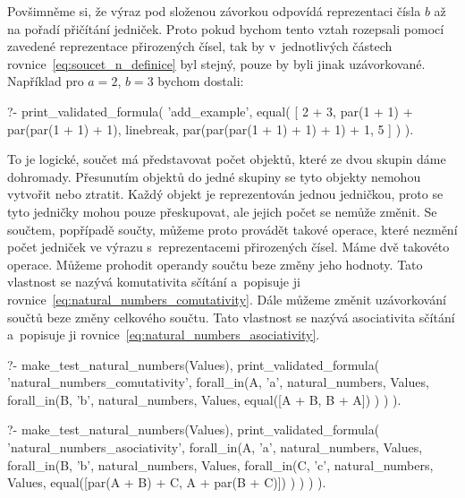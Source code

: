 Povšimněme si, že výraz pod složenou závorkou odpovídá reprezentaci čísla \(b\) až na pořadí přičítání jedniček. Proto pokud bychom tento vztah rozepsali pomocí zavedené reprezentace přirozených čísel, tak by  v~jednotlivých částech rovnice~\eqref{eq:soucet_n_definice} byl stejný, pouze by byli jinak uzávorkované. Například pro \(a=2\), \(b=3\) bychom dostali:

\begin{prolog}
?-	print_validated_formula(
		'add_example',
		equal(
			[
				2 + 3,
				par(1 + 1) + par(par(1 + 1) + 1),
				linebreak,
				par(par(par(1 + 1) + 1) + 1) + 1,
				5
			]
		)
	).
\end{prolog}

To je logické, součet má představovat počet objektů, které ze dvou skupin dáme dohromady. Přesunutím objektů do jedné skupiny se tyto objekty nemohou vytvořit nebo ztratit. Každý objekt je reprezentován jednou jedničkou, proto se tyto jedničky mohou pouze přeskupovat, ale jejich počet se nemůže změnit. Se součtem, popřípadě součty, můžeme proto provádět takové operace, které nezmění počet jedniček ve výrazu s~reprezentacemi přirozených čísel. Máme dvě takovéto operace. Můžeme prohodit operandy součtu beze změny jeho hodnoty. Tato vlastnost se nazývá komutativita sčítání a~popisuje ji rovnice~\eqref{eq:natural_numbers_comutativity}. Dále můžeme změnit uzávorkování součtů beze změny celkového součtu. Tato vlastnost se nazývá asociativita sčítání a~popisuje ji rovnice~\eqref{eq:natural_numbers_asociativity}.

\begin{fact}
\begin{prolog}
?-	make_test_natural_numbers(Values),
	print_validated_formula(
		'natural_numbers_comutativity',
		forall_in(A, 'a', natural_numbers, Values,
			forall_in(B, 'b', natural_numbers, Values,
				equal([A + B, B + A])
			)
		)
	).
\end{prolog}
\begin{prolog}
?-	make_test_natural_numbers(Values),
	print_validated_formula(
		'natural_numbers_asociativity',
		forall_in(A, 'a', natural_numbers, Values,
			forall_in(B, 'b', natural_numbers, Values,
				forall_in(C, 'c', natural_numbers, Values,
					equal([par(A + B) + C, A + par(B + C)])
				)
			)
		)
	).
\end{prolog}
\end{fact}

